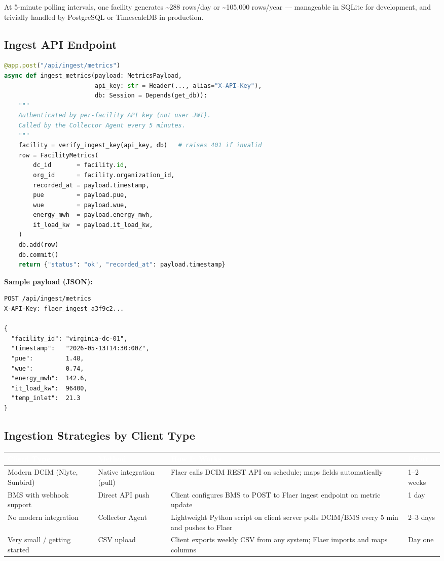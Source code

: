 \documentclass[11pt, a4paper]{article}
\newcommand{\tableheader}[1]{\cellcolor{flaergreen!90}\textcolor{white}{\textbf{\small #1}}}
\begin{document}
At 5-minute polling intervals, one facility generates \textasciitilde288 rows/day or \textasciitilde105,000 rows/year — manageable in SQLite for development, and trivially handled by PostgreSQL or TimescaleDB in production.

\subsection{Ingest API Endpoint}

\begin{lstlisting}[language=Python, caption=POST /api/ingest/metrics]
@app.post("/api/ingest/metrics")
async def ingest_metrics(payload: MetricsPayload,
                         api_key: str = Header(..., alias="X-API-Key"),
                         db: Session = Depends(get_db)):
    """
    Authenticated by per-facility API key (not user JWT).
    Called by the Collector Agent every 5 minutes.
    """
    facility = verify_ingest_key(api_key, db)   # raises 401 if invalid
    row = FacilityMetrics(
        dc_id       = facility.id,
        org_id      = facility.organization_id,
        recorded_at = payload.timestamp,
        pue         = payload.pue,
        wue         = payload.wue,
        energy_mwh  = payload.energy_mwh,
        it_load_kw  = payload.it_load_kw,
    )
    db.add(row)
    db.commit()
    return {"status": "ok", "recorded_at": payload.timestamp}
\end{lstlisting}

\textbf{Sample payload (JSON):}
\begin{lstlisting}[language={}]
POST /api/ingest/metrics
X-API-Key: flaer_ingest_a3f9c2...

{
  "facility_id": "virginia-dc-01",
  "timestamp":   "2026-05-13T14:30:00Z",
  "pue":         1.48,
  "wue":         0.74,
  "energy_mwh":  142.6,
  "it_load_kw":  96400,
  "temp_inlet":  21.3
}
\end{lstlisting}

\subsection{Ingestion Strategies by Client Type}

\begin{tabular}{p{3.2cm} p{3.5cm} p{5.8cm} p{1.6cm}}
  \toprule
  \tableheader{Client Type} & \tableheader{Method} & \tableheader{How It Works} & \tableheader{Effort} \\
  \midrule
  Modern DCIM (Nlyte, Sunbird) & Native integration (pull) & Flaer calls DCIM REST API on schedule; maps fields automatically & 1--2 weeks \\
  \rowcolor{rowalt} BMS with webhook support & Direct API push & Client configures BMS to POST to Flaer ingest endpoint on metric update & 1 day \\
  No modern integration & Collector Agent & Lightweight Python script on client server polls DCIM/BMS every 5 min and pushes to Flaer & 2--3 days \\
  \rowcolor{rowalt} Very small / getting started & CSV upload & Client exports weekly CSV from any system; Flaer imports and maps columns & Day one \\
  \bottomrule
\end{tabular}
\end{document}

